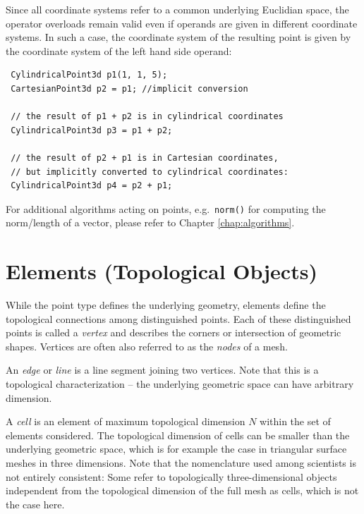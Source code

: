 
Since all coordinate systems refer to a common underlying Euclidian space, the operator overloads remain valid even if operands are given in different coordinate systems. In such a case, the coordinate system of the resulting point is given by the coordinate system of the left hand side operand:
\begin{lstlisting}
 CylindricalPoint3d p1(1, 1, 5);
 CartesianPoint3d p2 = p1; //implicit conversion

 // the result of p1 + p2 is in cylindrical coordinates
 CylindricalPoint3d p3 = p1 + p2;

 // the result of p2 + p1 is in Cartesian coordinates,
 // but implicitly converted to cylindrical coordinates:
 CylindricalPoint3d p4 = p2 + p1;
\end{lstlisting}
For additional algorithms acting on points, e.g.~\lstinline|norm()| for computing the norm/length of a vector, please refer to Chapter \ref{chap:algorithms}.


\section{Elements (Topological Objects)} \label{sec:ncells}
While the point type defines the underlying geometry, elements define the topological connections among distinguished points. Each of these distinguished points is called a \emph{vertex} and describes the corners or intersection of geometric shapes. Vertices are often also referred to as the \emph{nodes} of a mesh.

An \emph{edge} or \emph{line} is a line segment joining two vertices.
Note that this is a topological characterization -- the underlying geometric space can have arbitrary dimension.

A \emph{cell} is an element of maximum topological dimension $N$ within the set of elements considered.
The topological dimension of cells can be smaller than the underlying geometric space, which is for example the case in triangular surface meshes in three dimensions.
Note that the nomenclature used among scientists is not entirely consistent:
Some refer to topologically three-dimensional objects independent from the topological dimension of the full mesh as cells, which is not the case here.

